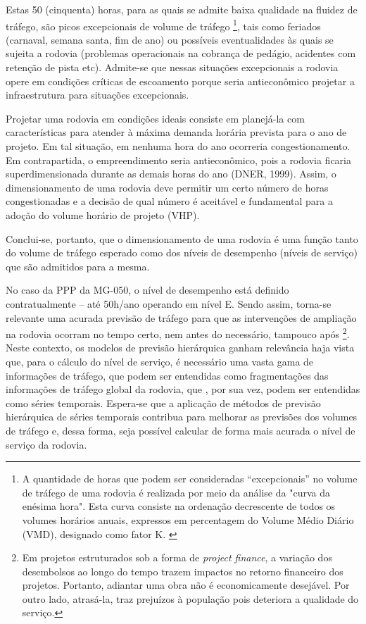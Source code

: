 \documentclass[
	12pt,				%
	openright,			%
	twoside,			%
	a4paper,			%
	english,			%
	french,				%
	spanish,			%
	brazil				%
	]{abntex2}
\begin{document}
Estas 50 (cinquenta) horas, para as quais se admite baixa qualidade na fluidez de tráfego, são picos excepcionais de volume de tráfego \footnote{A quantidade de horas que podem ser consideradas “excepcionais” no volume de tráfego de uma rodovia é realizada por meio da análise da "curva da enésima hora". Esta curva consiste na ordenação decrescente de todos os volumes horários anuais, expressos em percentagem do Volume Médio Diário (VMD), designado como fator K. \cite{manualdnit2006}}, tais como feriados (carnaval, semana santa, fim de ano) ou possíveis eventualidades às quais se sujeita a rodovia (problemas operacionais na cobrança de pedágio, acidentes com retenção de pista etc). Admite-se que nessas situações excepcionais a rodovia opere em condições críticas de escoamento porque seria antieconômico projetar a infraestrutura para situações excepcionais.

\begin{citacao}
Projetar uma rodovia em condições ideais consiste em planejá-la com características para atender à máxima demanda horária prevista para o ano de projeto. Em tal situação, em nenhuma hora do ano ocorreria congestionamento. Em contrapartida, o empreendimento seria antieconômico, pois a rodovia ficaria superdimensionada durante as demais horas do ano (DNER, 1999). Assim, o dimensionamento de uma rodovia deve permitir um certo número de horas congestionadas e a decisão de qual número é aceitável e fundamental para a adoção do volume horário de projeto (VHP). 
\end{citacao}

Conclui-se, portanto, que o dimensionamento de uma rodovia é uma função tanto do volume de tráfego esperado como dos níveis de desempenho (níveis de serviço) que são admitidos  para a mesma. 

No caso da PPP da MG-050, o nível de desempenho está definido contratualmente – até 50h/ano operando em nível E. Sendo assim, torna-se relevante uma acurada previsão de tráfego para que as intervenções de ampliação na rodovia ocorram no tempo certo, nem antes do necessário, tampouco após \footnote{Em projetos estruturados sob a forma de \emph{project finance}, a variação dos desembolsos ao longo do tempo trazem impactos no retorno financeiro dos projetos. Portanto, adiantar uma obra não é economicamente desejável. Por outro lado, atrasá-la, traz prejuízos à população pois deteriora a qualidade do serviço.}. Neste contexto, os modelos de previsão hierárquica ganham relevância haja vista que, para o cálculo do nível de serviço, é necessário uma vasta gama de informações de tráfego, que podem ser entendidas como fragmentações das informações de tráfego global da rodovia, que , por sua vez, podem ser entendidas como séries temporais.
Espera-se que a aplicação de métodos de previsão hierárquica de séries temporais contribua para melhorar as previsões dos volumes de tráfego e, dessa forma, seja possível calcular de forma mais acurada o nível de serviço da rodovia.
\end{document}
